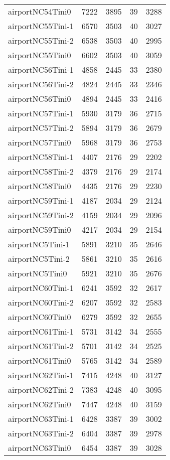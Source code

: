 \begin{longtable}{lrrrr}
airportNC54Tini0 & 7222 & 3895 & 39 & 3288 \\
airportNC55Tini-1 & 6570 & 3503 & 40 & 3027 \\
airportNC55Tini-2 & 6538 & 3503 & 40 & 2995 \\
airportNC55Tini0 & 6602 & 3503 & 40 & 3059 \\
airportNC56Tini-1 & 4858 & 2445 & 33 & 2380 \\
airportNC56Tini-2 & 4824 & 2445 & 33 & 2346 \\
airportNC56Tini0 & 4894 & 2445 & 33 & 2416 \\
airportNC57Tini-1 & 5930 & 3179 & 36 & 2715 \\
airportNC57Tini-2 & 5894 & 3179 & 36 & 2679 \\
airportNC57Tini0 & 5968 & 3179 & 36 & 2753 \\
airportNC58Tini-1 & 4407 & 2176 & 29 & 2202 \\
airportNC58Tini-2 & 4379 & 2176 & 29 & 2174 \\
airportNC58Tini0 & 4435 & 2176 & 29 & 2230 \\
airportNC59Tini-1 & 4187 & 2034 & 29 & 2124 \\
airportNC59Tini-2 & 4159 & 2034 & 29 & 2096 \\
airportNC59Tini0 & 4217 & 2034 & 29 & 2154 \\
airportNC5Tini-1 & 5891 & 3210 & 35 & 2646 \\
airportNC5Tini-2 & 5861 & 3210 & 35 & 2616 \\
airportNC5Tini0 & 5921 & 3210 & 35 & 2676 \\
airportNC60Tini-1 & 6241 & 3592 & 32 & 2617 \\
airportNC60Tini-2 & 6207 & 3592 & 32 & 2583 \\
airportNC60Tini0 & 6279 & 3592 & 32 & 2655 \\
airportNC61Tini-1 & 5731 & 3142 & 34 & 2555 \\
airportNC61Tini-2 & 5701 & 3142 & 34 & 2525 \\
airportNC61Tini0 & 5765 & 3142 & 34 & 2589 \\
airportNC62Tini-1 & 7415 & 4248 & 40 & 3127 \\
airportNC62Tini-2 & 7383 & 4248 & 40 & 3095 \\
airportNC62Tini0 & 7447 & 4248 & 40 & 3159 \\
airportNC63Tini-1 & 6428 & 3387 & 39 & 3002 \\
airportNC63Tini-2 & 6404 & 3387 & 39 & 2978 \\
airportNC63Tini0 & 6454 & 3387 & 39 & 3028 \\

\end{longtable}
